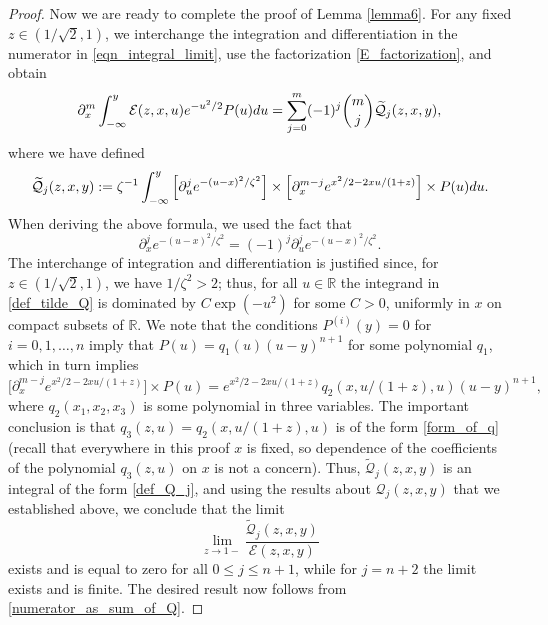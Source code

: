 \documentclass[10pt,a4paper]{amsart}
\def\E{{\mathcal E}}
\def\d{{\textnormal d}}
\def\r{{\mathbb R}}
\begin{document}
\begin{proof}
Now we are ready to complete the proof of Lemma \ref{lemma6}. For any fixed $z\in (1/\sqrt{2},1)$, we interchange the integration and differentiation in the numerator in \eqref{eqn_integral_limit},   
use the factorization \eqref{E_factorization}, and obtain
\begin{equation}\label{numerator_as_sum_of_Q}
\partial_x^{m} \int_{-\infty}^y \E(z,x,u) e^{-u^2/2}  P(u) \d u
= \sum\limits_{j=0}^m (-1)^j \binom{m}{j} \widetilde {\mathcal Q}_{j}(z,x,y),
\end{equation}
where we have defined 
\begin{equation}\label{def_tilde_Q}
\widetilde {\mathcal Q}_{j}(z,x,y):=\zeta^{-1} \int_{-\infty}^y
\Big[ \partial_u^{j} e^{-(u-x)^2/\zeta^2} \Big]  \times \Big[ \partial_x^{m-j} e^{x^2/2-2xu/(1+z)} \Big]  \times P(u) \d u.
\end{equation}
When deriving the above formula, we used the fact that 
\[
\partial_x^{j} e^{-(u-x)^2/\zeta^2}=(-1)^j \partial_u^{j} e^{-(u-x)^2/\zeta^2}. 
\]
The interchange of integration and differentiation is justified since, for $z\in (1/\sqrt{2},1)$, we have $1/\zeta^2>2$; thus, for all $u\in \r$ the integrand in \eqref{def_tilde_Q} is dominated by $C\exp(- u^2)$ for some $C>0$, uniformly in $x$ on compact subsets of $\r$.  We note that the conditions  $P^{(i)}(y)=0$ for $i=0,1,\dots,n$ imply that $P(u)=q_1(u) (u-y)^{n+1}$ for some polynomial $q_1$, which in turn implies
\[
\Big[ \partial_x^{m-j} e^{x^2/2-2xu/(1+z)} \Big] \times  P(u)=
e^{x^2/2-2xu/(1+z)} q_2(x,u/(1+z),u) (u-y)^{n+1},
\]
where $q_2(x_1,x_2,x_3)$ is some polynomial in three variables.   The important conclusion is that $q_3(z,u)=q_2(x,u/(1+z),u)$ is of the form \eqref{form_of_q} (recall that everywhere in this proof $x$ is fixed, so dependence of the coefficients of the polynomial $q_3(z,u)$ on $x$ is not a concern). Thus, $\widetilde {\mathcal Q}_{j}(z,x,y)$ is an integral of the form \eqref{def_Q_j}, and using the results about ${\mathcal Q}_j(z,x,y)$ that we established above, we conclude that the limit  
\[
\lim\limits_{z\to 1-} \frac{\widetilde {\mathcal Q}_{j}(z,x,y)}{\E(z,x,y)} 
\]
exists and is equal to zero for all $0\leqslant j \leqslant n+1$, while for $j=n+2$ the limit exists and is finite. The desired result now follows from \eqref{numerator_as_sum_of_Q}.
\end{proof}
\end{document}
